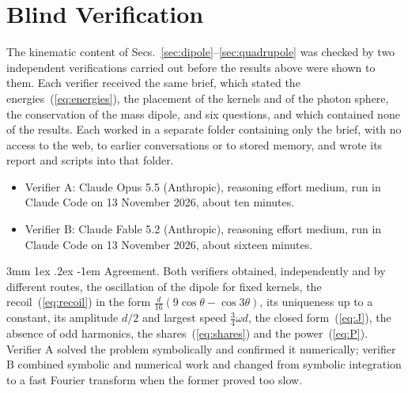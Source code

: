 \documentclass[%
 reprint, amsmath,amssymb, aps, prb, ]{revtex4-2}
\makeatletter
\numberwithin{equation}{section}
\renewcommand\paragraph{%
  \@startsection{paragraph}{4}{\z@}%
    {3mm \@plus 1ex \@minus .2ex}%
    {-1em}%
    {\normalfont\normalsize\itshape}}
\makeatother
\begin{document}
\section{Blind Verification}
\label{app:blind}

The kinematic content of Secs.~\ref{sec:dipole}--\ref{sec:quadrupole} was checked by two independent verifications carried out before the results above were shown to them. Each verifier received the same brief, which stated the energies~(\ref{eq:energies}), the placement of the kernels and of the photon sphere, the conservation of the mass dipole, and six questions, and which contained none of the results. Each worked in a separate folder containing only the brief, with no access to the web, to earlier conversations or to stored memory, and wrote its report and scripts into that folder.

\begin{itemize}[leftmargin=1.2em]
\item Verifier A: Claude Opus 5.5 (Anthropic), reasoning effort medium, run in Claude Code on 13 November 2026, about ten minutes.
\item Verifier B: Claude Fable 5.2 (Anthropic), reasoning effort medium, run in Claude Code on 13 November 2026, about sixteen minutes.
\end{itemize}

\paragraph{Agreement.} Both verifiers obtained, independently and by different routes, the oscillation of the dipole for fixed kernels, the recoil~(\ref{eq:recoil}) in the form $\tfrac d{16}(9\cos\theta - \cos3\theta)$, its uniqueness up to a constant, its amplitude $d/2$ and largest speed $\tfrac34\omega d$, the closed form~(\ref{eq:J}), the absence of odd harmonics, the shares~(\ref{eq:shares}) and the power~(\ref{eq:P}). Verifier A solved the problem symbolically and confirmed it numerically; verifier B combined symbolic and numerical work and changed from symbolic integration to a fast Fourier transform when the former proved too slow.
\end{document}
